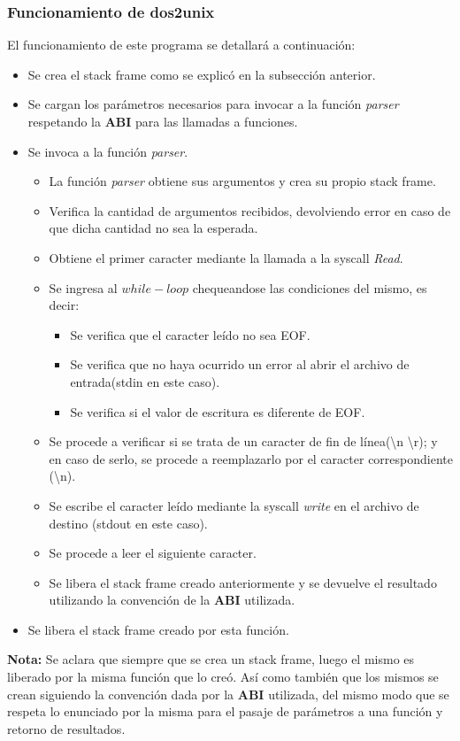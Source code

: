 \documentclass[a4paper,10pt]{article}
\begin{document}
    \subsubsection{Funcionamiento de dos2unix}
    El funcionamiento de este programa se detallar\'a a continuaci\'on:
      \begin{itemize}
       \item Se crea el stack frame como se explic\'o en la subsecci\'on anterior.
       \item Se cargan los par\'ametros necesarios para invocar a la funci\'on \textit{parser} respetando la {\bf ABI} para las llamadas a funciones.
       \item Se invoca a la funci\'on \textit{parser}.
	\begin{itemize}
	\item La funci\'on \textit{parser} obtiene sus argumentos y crea su propio stack frame.
	\item Verifica la cantidad de argumentos recibidos, devolviendo error en caso de que dicha cantidad no sea la esperada.
	\item Obtiene el primer caracter mediante la llamada a la syscall \textit{Read}.
	\item Se ingresa al \textit{$while-loop$} chequeandose las condiciones del mismo, es decir:
	  \begin{itemize}
	    \item Se verifica que el caracter le\'ido no sea EOF.
	    \item Se verifica que no haya ocurrido un error al abrir el archivo de entrada(stdin en este caso).
	    \item Se verifica si el valor de escritura es diferente de EOF.
	  \end{itemize}
	\item Se procede a verificar si se trata de un caracter de fin de l\'inea(\textbackslash n \textbackslash r); y en caso de serlo, se procede a reemplazarlo por el caracter correspondiente (\textbackslash n).
	\item Se escribe el caracter le\'ido mediante la syscall \textit{write} en el archivo de destino (stdout en este caso).
	\item Se procede a leer el siguiente caracter.
	\item Se libera el stack frame creado anteriormente y se devuelve el resultado utilizando la convenci\'on de la {\bf ABI} utilizada.
	\end{itemize}
       \item Se libera el stack frame creado por esta funci\'on.
      \end{itemize}
      {\bf Nota:} Se aclara que siempre que se crea un stack frame, luego el mismo es liberado por la misma funci\'on que lo cre\'o. As\'i como tambi\'en que los mismos
      se crean siguiendo la convenci\'on dada por la {\bf ABI} utilizada, del mismo modo que se respeta lo enunciado por la misma para el pasaje de par\'ametros a una funci\'on y
      retorno de resultados.
\end{document}
